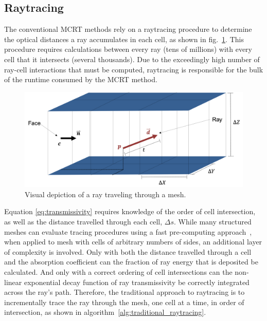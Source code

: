 \subsection{Raytracing}
The conventional MCRT methods rely on a raytracing procedure to determine the optical distances a ray accumulates in each cell, as shown in fig.~\ref{fig:raytracing}. This procedure requires calculations between every ray (tens of millions) with every cell that it intersects (several thousands). 
Due to the exceedingly high number of ray-cell interactions that must be computed, raytracing is responsible for the bulk of the runtime consumed by the MCRT method.
\begin{figure}
\centering
\includegraphics[width=0.8\linewidth]{figures/ch3/TracingThroughMesh.png}
\caption{Visual depiction of a ray traveling through a mesh. }
\label{fig:raytracing}
\end{figure}
Equation \ref{eq:transmissivity} requires knowledge of the order of cell intersection, as well as the distance travelled through each cell, $\Delta{}s$. While many structured meshes can evaluate tracing procedures using a fast pre-computing approach~\cite{Amanatides1987ATracing}, when applied to mesh with cells of arbitrary numbers of sides, an additional layer of complexity is involved.
Only with both the distance travelled through a cell and the absorption coefficient can the fraction of ray energy that is deposited be calculated.
And only with a correct ordering of cell intersections can the non-linear exponential decay function of ray transmissivity be correctly integrated across the ray's path.
Therefore, the traditional approach to raytracing is to incrementally trace the ray through the mesh, one cell at a time, in order of intersection, as shown in algorithm~\ref{alg:traditional_raytracing}.

